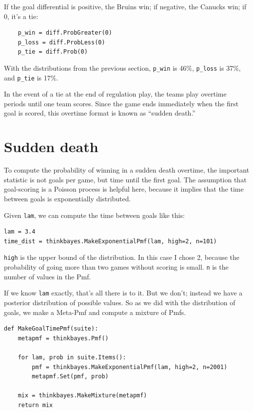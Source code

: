 \documentclass[12pt]{book}
\begin{document}
If the goal differential is positive, the Bruins win; if negative, the
Canucks win; if 0, it's a tie:

\begin{verbatim}
    p_win = diff.ProbGreater(0)
    p_loss = diff.ProbLess(0)
    p_tie = diff.Prob(0)
\end{verbatim}  

With the distributions from the previous section, \verb"p_win"
is 46\%, \verb"p_loss" is 37\%, and \verb"p_tie" is 17\%.

In the event of a tie at the end of regulation play, the teams play
overtime periods until one team scores.  Since the game ends
immediately when the first goal is scored, this overtime format
is known as ``sudden death.''


\section{Sudden death}

To compute the probability of winning in a sudden death overtime,
the important statistic is not goals per game, but time until the
first goal.  The assumption that goal-scoring is a Poisson process
is helpful here, because it implies that the time between goals
is exponentially distributed.

Given {\tt lam}, we can compute the time between goals like this: 

\begin{verbatim}
lam = 3.4
time_dist = thinkbayes.MakeExponentialPmf(lam, high=2, n=101)
\end{verbatim}  

{\tt high} is the upper bound of the distribution.  In this case
I chose 2, because the probability of going more than two games
without scoring is small.  {\tt n} is the number of values in
the Pmf.

If we know {\tt lam} exactly, that's all there is to it.
But we don't; instead we have a posterior
distribution of possible values.  So as we did with the distribution
of goals, we make a Meta-Pmf and compute a mixture of
Pmfs.

\begin{verbatim}
def MakeGoalTimePmf(suite):
    metapmf = thinkbayes.Pmf()

    for lam, prob in suite.Items():
        pmf = thinkbayes.MakeExponentialPmf(lam, high=2, n=2001)
        metapmf.Set(pmf, prob)

    mix = thinkbayes.MakeMixture(metapmf)
    return mix
\end{verbatim}  
\end{document}

